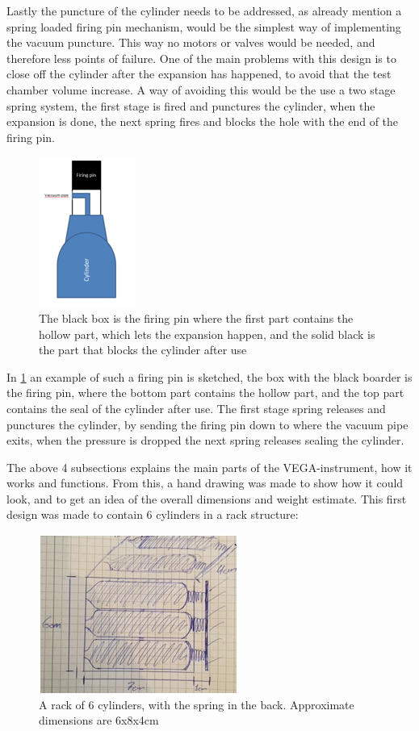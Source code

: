 Lastly the puncture of the cylinder needs to be addressed, as already mention a spring loaded firing pin mechanism, would be the simplest way of implementing the vacuum puncture. This way no motors or valves would be needed, and therefore less points of failure. One of the main problems with this design is to close off the cylinder after the expansion has happened, to avoid that the test chamber volume increase. A way of avoiding this would be the use a two stage spring system, the first stage is fired and punctures the cylinder, when the expansion is done, the next spring fires and blocks the hole with the end of the firing pin.

\begin{figure}[htb]
  \centering
  \includegraphics[scale=1]{figures/GasDetectionAgge/Firingpin}
  \caption{The black box is the firing pin where the first part contains the hollow part, which lets the expansion happen, and the solid black is the part that blocks the cylinder after use}
  \label{fig:FiringPin}
\end{figure}

In \ref{fig:FiringPin} an example of such a firing pin is sketched, the box with the black boarder is the firing pin, where the bottom part contains the hollow part, and the top part contains the seal of the cylinder after use. The first stage spring releases and punctures the cylinder, by sending the firing pin down to where the vacuum pipe exits, when the pressure is dropped the next spring releases sealing the cylinder.

The above 4 subsections explains the main parts of the VEGA-instrument, how it works and functions. From this, a hand drawing was made to show how it could look, and to get an idea of the overall dimensions and weight estimate. This first design was made to contain 6 cylinders in a rack structure:

\begin{figure}[htb]
  \centering
  \includegraphics[scale=1]{figures/GasDetectionAgge/CylinderRack}
  \caption{A rack of 6 cylinders, with the spring in the back. Approximate dimensions are 6x8x4cm}
  \label{fig:RackOfSix}
\end{figure}

